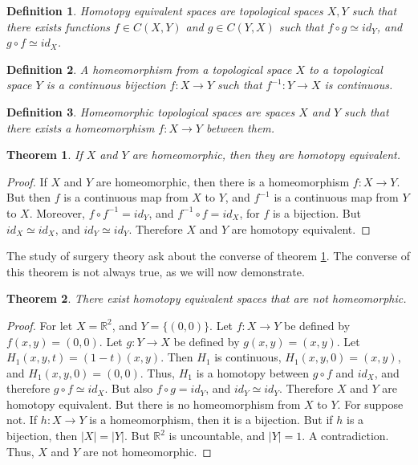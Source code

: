\documentclass[oneside]{book}
\theoremstyle{mystyle}
\newtheorem{theorem}{Theorem}[section]
\newtheorem{definition}{Definition}[section]
\begin{document}
\begin{definition}
Homotopy equivalent spaces are topological spaces $X,Y$ such that there exists functions $f\in C(X,Y)$ and $g\in C(Y,X)$ such that $f\circ g \simeq id_{Y}$, and $g\circ f \simeq id_{X}$.
\end{definition}
\begin{definition}
A homeomorphism from a topological space $X$ to a topological space $Y$ is a continuous bijection $f:X\rightarrow Y$ such that $f^{-1}:Y\rightarrow X$ is continuous.
\end{definition}
\begin{definition}
Homeomorphic topological spaces are spaces $X$ and $Y$ such that there exists a homeomorphism $f:X\rightarrow Y$ between them.
\end{definition}
\begin{theorem}
\label{theorem:surgery_theory_homeomorphic_implies_homotopy_equivalent}
If $X$ and $Y$ are homeomorphic, then they are homotopy equivalent.
\end{theorem}
\begin{proof}
If $X$ and $Y$ are homeomorphic, then there is a homeomorphism $f:X\rightarrow Y$. But then $f$ is a continuous map from $X$ to $Y$, and $f^{-1}$ is a continuous map from $Y$ to $X$. Moreover, $f\circ f^{-1} = id_{Y}$, and $f^{-1}\circ f = id_{X}$, for $f$ is a bijection. But $id_{X}\simeq id_{X}$, and $id_{Y}\simeq id_{Y}$. Therefore $X$ and $Y$ are homotopy equivalent.
\end{proof}
The study of surgery theory ask about the converse of theorem \ref{theorem:surgery_theory_homeomorphic_implies_homotopy_equivalent}. The converse of this theorem is not always true, as we will now demonstrate.
\begin{theorem}
\label{theorem:surgery_theory_homotopic_does_not_imply_homeomorphic}
There exist homotopy equivalent spaces that are not homeomorphic.
\end{theorem}
\begin{proof}
For let $X=\mathbb{R}^{2}$, and $Y = \{(0,0)\}$. Let $f:X\rightarrow Y$ be defined by $f(x,y) = (0,0)$. Let $g:Y\rightarrow X$ be defined by $g(x,y) = (x,y)$. Let $H_1(x,y,t) = (1-t)(x,y)$. Then $H_{1}$ is continuous, $H_{1}(x,y,0) = (x,y)$, and $H_{1}(x,y,0) = (0,0)$. Thus, $H_{1}$ is a homotopy between $g\circ f$ and $id_{X}$, and therefore $g\circ f \simeq id_{X}$. But also $f\circ g = id_{Y}$, and $id_{Y}\simeq id_{Y}$. Therefore $X$ and $Y$ are homotopy equivalent. But there is no homeomorphism from $X$ to $Y$. For suppose not. If $h:X\rightarrow Y$ is a homeomorphism, then it is a bijection. But if $h$ is a bijection, then $|X| = |Y|$. But $\mathbb{R}^2$ is uncountable, and $|Y| = 1$. A contradiction. Thus, $X$ and $Y$ are not homeomorphic.
\end{proof}
\end{document}
